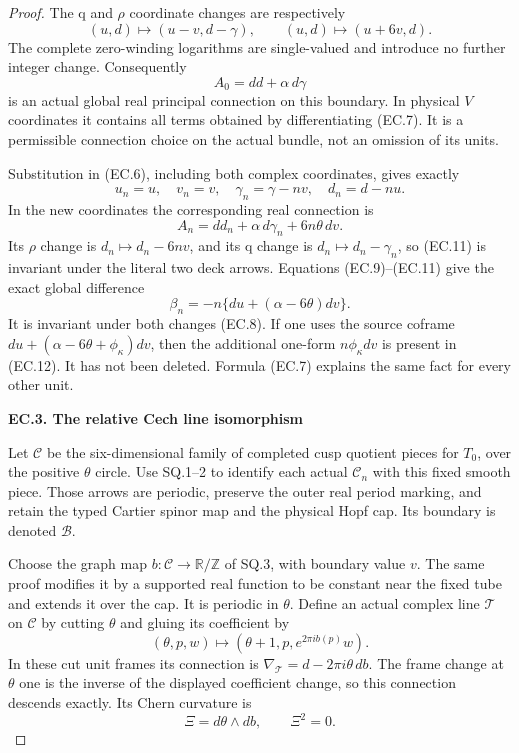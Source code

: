 \begin{proof}
The q and \(\rho\) coordinate changes are respectively
\[
 (u,d)\mapsto(u-v,d-\gamma),\qquad
 (u,d)\mapsto(u+6v,d).
                                                        \tag{EC.8}
\]
The complete zero-winding logarithms are single-valued and introduce
no further integer change. Consequently
\[
 A_0=dd+\alpha\,d\gamma
                                                        \tag{EC.9}
\]
is an actual global real principal connection on this boundary.
In physical \(V\) coordinates it contains all terms obtained by
differentiating (EC.7). It is a permissible connection choice on the
actual bundle, not an omission of its units.

Substitution in (EC.6), including both complex coordinates, gives
exactly
\[
 u_n=u,\quad v_n=v,\quad\gamma_n=\gamma-nv,\quad d_n=d-nu.
                                                        \tag{EC.10}
\]
In the new coordinates the corresponding real connection is
\[
 A_n=dd_n+\alpha\,d\gamma_n+6n\theta\,dv.
                                                        \tag{EC.11}
\]
Its \(\rho\) change is \(d_n\mapsto d_n-6nv\), and its q change is
\(d_n\mapsto d_n-\gamma_n\), so (EC.11) is invariant under the
literal two deck arrows. Equations (EC.9)--(EC.11) give the exact
global difference
\[
 \beta_n=-n\{du+(\alpha-6\theta)dv\}.
                                                        \tag{EC.12}
\]
It is invariant under both changes (EC.8). If one uses the source
coframe \(du+(\alpha-6\theta+\phi_\kappa)dv\), then the additional
one-form \(n\phi_\kappa dv\) is present in (EC.12). It has not been
deleted. Formula (EC.7) explains the same fact for every other unit.

\par

\medskip\noindent\textbf{EC.3. The relative Cech line isomorphism}

\par\nobreak

Let \(\mathcal C\) be the six-dimensional family of completed cusp
quotient pieces for \(T_0\), over the positive \(\theta\) circle. Use
SQ.1--2 to identify each actual \(\mathcal C_n\) with this fixed
smooth piece. Those arrows are periodic, preserve the outer real
period marking, and retain the typed Cartier spinor map and the
physical Hopf cap. Its boundary is denoted \(\mathcal B\).

Choose the graph map \(b:\mathcal C\to\mathbb R/\mathbb Z\) of
SQ.3, with boundary value \(v\). The same proof modifies it by a
supported real function to be constant near the fixed tube and
extends it over the cap. It is periodic in \(\theta\). Define an actual
complex line \(\mathcal T\) on \(\mathcal C\) by cutting \(\theta\)
and gluing its coefficient by
\[
 (\theta,p,w)\longmapsto
       (\theta+1,p,e^{2\pi i b(p)}w).
                                                        \tag{EC.13}
\]
In these cut unit frames its connection is
\(\nabla_{\mathcal T}=d-2\pi i\theta\,db\). The frame change at
\(\theta\) one is the inverse of the displayed coefficient change, so
this connection descends exactly. Its Chern curvature is
\[
                         \Xi=d\theta\wedge db,\qquad \Xi^2=0.
                                                        \tag{EC.14}
\]


\end{proof}
